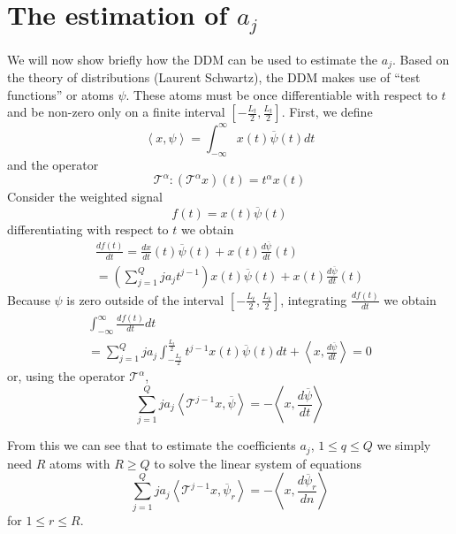 \documentclass[twoside,a4paper]{article}
\begin{document}
\section{The estimation of $a_j$}
We will now show briefly how the DDM can be used to estimate the $a_j$. Based on
the theory of distributions (Laurent Schwartz), the DDM
makes use of ``test
functions'' or atoms $\psi$. These atoms must be once differentiable with respect to
$t$ and be non-zero only on a finite interval $[-\frac{L_{t}}{2},\frac{L_{t}}{2}]$. First, we define
%
\begin{equation}
    \label{eq:ddm:inner:prod:def}
    \left\langle x , \psi \right\rangle = 
    \int_{-\infty}^{\infty}x(t)\overline{\psi}(t)dt
\end{equation}
%
and the operator 
%
\[
\mathcal{T}^{\alpha} : (\mathcal{T}^{\alpha}x)(t) = t^{\alpha}x(t)
\]
%
Consider the weighted signal
%
\[
    f(t) = x(t) \overline{\psi}(t)
\]
%
differentiating with respect to $t$ we obtain
%
\begin{multline}
    \label{eq:ddm:weighted:sig:derivative}
    \frac{df(t)}{dt} = 
    \frac{dx}{dt}(t)\overline{\psi}(t)
    + x(t)\frac{d\overline{\psi}}{dt}(t) \\
    = \left( \sum_{j=1}^{Q} j a_j t^{j-1} \right) x(t)\overline{\psi}(t)
    + x(t)\frac{d\overline{\psi}}{dt}(t)
\end{multline}
%
Because $\psi$ is zero outside of the interval $[-\frac{L_{t}}{2},\frac{L_{t}}{2}]$, integrating
$\frac{df(t)}{dt}$ we obtain
%
\begin{multline*}
    \int_{-\infty}^{\infty}\frac{df(t)}{dt}dt \\
    = \sum_{j=1}^{Q} j a_j \int_{-\frac{L_{t}}{2}}^{\frac{L_{t}}{2}} t^{j-1} x(t) \overline{\psi}(t) dt
    + \left\langle x, \frac{d\overline{\psi}}{dt} \right\rangle = 0
\end{multline*}
%
or, using the operator $\mathcal{T}^{\alpha}$,
%
\[ 
    \sum_{j=1}^{Q} j a_j 
    \left\langle \mathcal{T}^{j-1} x , \overline{\psi} \right\rangle
    = -\left\langle x, \frac{d\overline{\psi}}{dt} \right\rangle
\]
%

From this we can see that to estimate the coefficients $a_j$, $ 1 \leq q \leq Q
$ we simply need $R$ atoms with $R \geq Q$ to solve the linear system of
equations
\begin{equation}
    \label{eq:ddmsyseq}
    \sum_{j=1}^{Q} j a_j 
    \left\langle \mathcal{T}^{j-1} x , \overline{\psi}_{r} \right\rangle
    = -\left\langle x, \frac{d\overline{\psi}_{r}}{dn} \right\rangle
\end{equation}
for $1 \leq r \leq R$.
\end{document}
